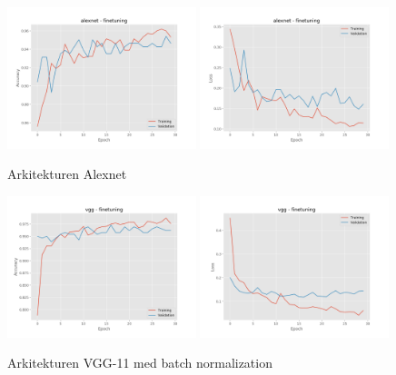 \documentclass{kththesis}
\begin{document}
    \begin{figure}
      \centering
      \includegraphics[width=0.49\textwidth]{"./balcony/balcony-20split - acc - alexnet - finetuning"}
      \includegraphics[width=0.49\textwidth]{"./balcony/balcony-20split - loss - alexnet - finetuning"}
      \caption{Arkitekturen Alexnet}
    \end{figure}

    \begin{figure}
      \centering
      \includegraphics[width=0.49\textwidth]{"./balcony/balcony-20split - acc - vgg - finetuning"}
      \includegraphics[width=0.49\textwidth]{"./balcony/balcony-20split - loss - vgg - finetuning"}
      \caption{Arkitekturen VGG-11 med batch normalization}
    \end{figure}
\end{document}

